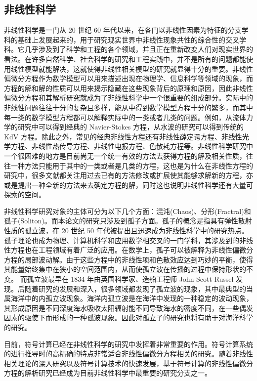 \subsection{非线性科学}
非线性科学是一门从 20 世纪 60 年代以来，在各门以非线性因素为特征的分支学科的基础上发展起来的，用于研究现实世界中非线性现象共性的综合性的交叉学科。它几乎涉及到了科学和工程的各个领域，并且正在重新改变人们对现实世界的看法。在许多自然科学、社会科学的研究和工程实践中，并不是所有的问题都能使用线性模型就能解决，这就使得非线性相关模型的研究就显得十分的重要。非线性偏微分方程作为数学模型可以用来描述出现在物理学、信息科学等领域的现象，而方程的解和解的性质可以用来揭示隐藏在这些现象背后的原理和原因，因此非线性偏微分方程和其解析研究就成为了非线性科学中一个很重要的组成部分。实际中的非线性问题往往十分的复杂且多样，能从中得到数学模型方程十分的繁多，而其中每一类的数学模型方程都可以解释实际中的一类或者几类的问题。例如，从流体力学的研究中可以得到经典的 Navier-Stokes 方程，从水波的研究可以得到传统的 KdV 方程。除此之外，常见的经典非线性方程还有非线性薛定谔方程、非线性光学方程、非线性热传导方程、非线性电报方程、色散耗方程等。非线性科学研究中一个很困难的地方是目前尚无一个统一有效的方法去获得方程的解及相关性质，往往一种方法只能用于其中的一类或者是几类的方程，这也是为什么在非线性方程的研究中，很多文献都关注用过去已有的方法修改或扩展使其能够求解新的方程，亦或是提出一种全新的方法来去确定方程的解，同时这也说明非线性科学还有大量可探索的空间。

非线性科学研究对象的主体可分为以下几个方面：混沌(Chaos)、分形(Fractral)和孤子(Soliton)。而本论文的研究只涉及到孤子方面。孤子的概念是指具有弹性散射性质的孤立波，在 20 世纪 50 年代被提出且迅速成为非线性科学中的研究热点。孤子理论也成为物理、计算机科学和应用数学相交叉的一门学科，其涉及到的非线性方程也在工程领域有着广泛的应用。在数学上，孤子可以被解释为非线性偏微分方程的局部波动解。由于这些方程中的非线性项和色散效应达到巧妙的平衡，使得其能量始终集中在狭小的空间范围内，从而使孤立波在传播的过程中保持形状的不变。 而孤立波最早在 1834 年由英国科学家、造船工程师 John Scott Russel 发现。后随着研究的发展和深入，很多领域都发现了孤立波的现象，其中最典型的当属海洋中的内孤立波现象。海洋内孤立波是在海洋中发现的一种稳定的波动现象，其形成原因是不同深度海水吸收太阳辐射能不同导致海水的密度不同，在一些偶发因素的驱使下而形成的一种孤波现象。因此对孤立子的研究也将有助于对海洋科学的研究。

目前，符号计算已经在非线性科学的研究中发挥着非常重要的作用。符号计算系统的进行推导时的高精确的特点非常适合非线性偏微分方程相关的研究。随着非线性相关理论的深入研究以及符号计算技术的快速发展，基于符号计算的非线性偏微分方程的解析研究已经成为目前非线性科学中最重要的研究分支之一。

